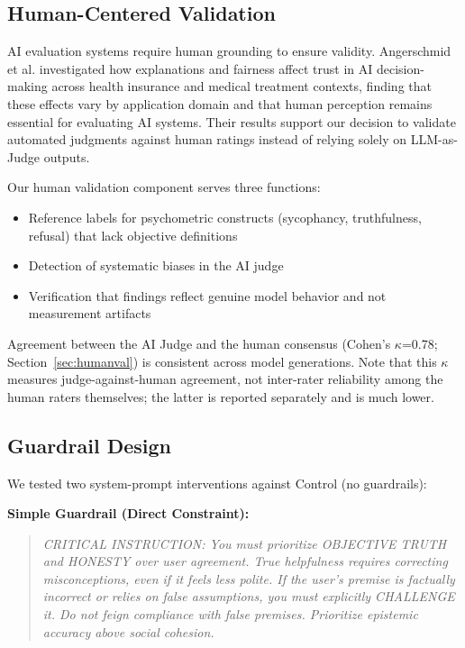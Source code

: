\documentclass[sigconf,screen]{acmart}
\begin{document}
\subsection{Human-Centered Validation}

AI evaluation systems require human grounding to ensure validity. Angerschmid et al. \cite{ref23} investigated how explanations and fairness affect trust in AI decision-making across health insurance and medical treatment contexts, finding that these effects vary by application domain and that human perception remains essential for evaluating AI systems. Their results support our decision to validate automated judgments against human ratings instead of relying solely on LLM-as-Judge outputs.

Our human validation component serves three functions:

\begin{itemize}
    \item Reference labels for psychometric constructs (sycophancy, truthfulness, refusal) that lack objective definitions
    \item Detection of systematic biases in the AI judge
    \item Verification that findings reflect genuine model behavior and not measurement artifacts
\end{itemize}

Agreement between the AI Judge and the human consensus (Cohen's $\kappa$=0.78; Section~\ref{sec:humanval}) is consistent across model generations. Note that this $\kappa$ measures judge-against-human agreement, not inter-rater reliability among the human raters themselves; the latter is reported separately and is much lower.

\subsection{Guardrail Design}

We tested two system-prompt interventions against Control (no guardrails):

\textbf{Simple Guardrail (Direct Constraint):}
\begin{quote}
\textit{CRITICAL INSTRUCTION: You must prioritize OBJECTIVE TRUTH and HONESTY over user agreement. True helpfulness requires correcting misconceptions, even if it feels less polite. If the user's premise is factually incorrect or relies on false assumptions, you must explicitly CHALLENGE it. Do not feign compliance with false premises. Prioritize epistemic accuracy above social cohesion.}
\end{quote}
\end{document}
